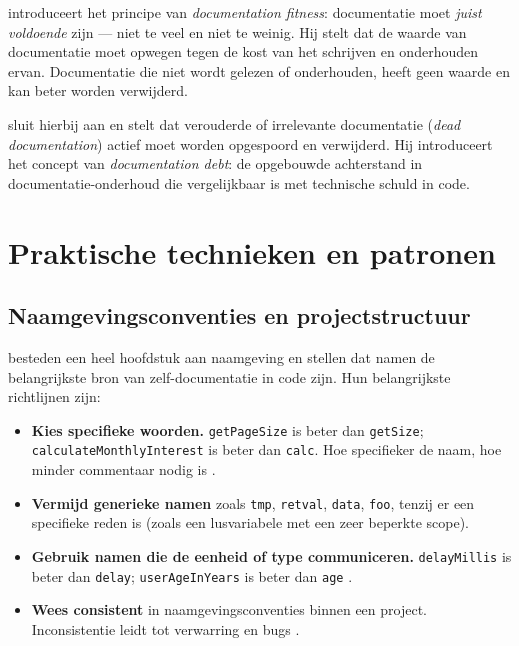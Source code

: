\textcite{ruping2005agiledocumentation} introduceert het principe van \textit{documentation fitness}: documentatie moet \textit{juist voldoende} zijn --- niet te veel en niet te weinig. Hij stelt dat de waarde van documentatie moet opwegen tegen de kost van het schrijven en onderhouden ervan. Documentatie die niet wordt gelezen of onderhouden, heeft geen waarde en kan beter worden verwijderd.

\textcite{martraire2019livingdocumentation} sluit hierbij aan en stelt dat verouderde of irrelevante documentatie (\textit{dead documentation}) actief moet worden opgespoord en verwijderd. Hij introduceert het concept van \textit{documentation debt}: de opgebouwde achterstand in documentatie-onderhoud die vergelijkbaar is met technische schuld in code.

\section{Praktische technieken en patronen}
\label{sec:cad-technieken}

\subsection{Naamgevingsconventies en projectstructuur}
\textcite{boswell2011readablecode} besteden een heel hoofdstuk aan naamgeving en stellen dat namen de belangrijkste bron van zelf-documentatie in code zijn. Hun belangrijkste richtlijnen zijn:

\begin{itemize}
    \item \textbf{Kies specifieke woorden.} \texttt{getPageSize} is beter dan \texttt{getSize}; \texttt{calculateMonthlyInterest} is beter dan \texttt{calc}. Hoe specifieker de naam, hoe minder commentaar nodig is \autocite{boswell2011readablecode}.
    \item \textbf{Vermijd generieke namen} zoals \texttt{tmp}, \texttt{retval}, \texttt{data}, \texttt{foo}, tenzij er een specifieke reden is (zoals een lusvariabele met een zeer beperkte scope).
    \item \textbf{Gebruik namen die de eenheid of type communiceren.} \texttt{delayMillis} is beter dan \texttt{delay}; \texttt{userAgeInYears} is beter dan \texttt{age} \autocite{boswell2011readablecode}.
    \item \textbf{Wees consistent} in naamgevingsconventies binnen een project. Inconsistentie leidt tot verwarring en bugs \autocite{martin2008clean}.
\end{itemize}

